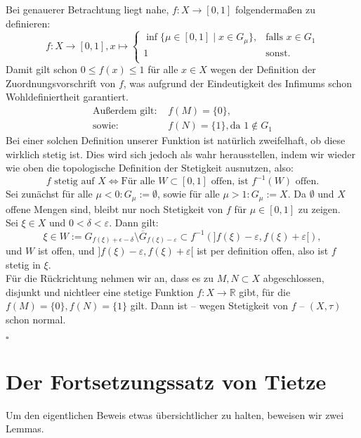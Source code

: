 \documentclass[11pt,leqno]{article}
\newcommand{\R}{\mathbb{R}}
\begin{document}
Bei genauerer Betrachtung liegt nahe, $f:X \rightarrow [0,1]$ folgendermaßen zu definieren:
\[f:X \rightarrow [0,1], x \mapsto \begin{cases}
    \inf \{\mu \in [0,1] \mid x \in G_\mu\},  & \text{falls }x \in G_1\\
    1 & \text{sonst.} \\
\end{cases} \]
Damit gilt schon $0 \leq f(x) \leq 1$ für alle $x \in X$ wegen der Definition der Zuordnungsvorschrift von $f$, was aufgrund der Eindeutigkeit des
Infimums schon Wohldefiniertheit garantiert.
\begin{align*}
    \text{Außerdem gilt: } & f(M) = \{0\}, \\
    \text{sowie: } &         f(N) = \{1\}, \text{da } 1 \notin G_1 
\end{align*}
Bei einer solchen Definition unserer Funktion ist natürlich zweifelhaft, ob diese wirklich stetig ist. Dies wird sich jedoch als wahr herausstellen,
indem wir wieder wie oben die topologische Definition der Stetigkeit ausnutzen, also:
\[f \text{ stetig auf } X \Leftrightarrow \text{Für alle } W \subset [0,1] \text { offen, ist } f^{-1}(W) \text{ offen.}\]
Sei zunächst für alle $\mu < 0: G_\mu := \emptyset$, sowie für alle $\mu > 1: G_\mu := X.$
Da $\emptyset$ und $X$ offene Mengen sind, bleibt nur noch Stetigkeit von $f$ für $\mu \in [0,1]$ zu zeigen. \\
Sei $\xi \in X$ und $0<\delta<\varepsilon$. Dann gilt: 
\[\xi \in W:=G_{f(\xi)+\epsilon-\delta}\setminus \overline{G}_{f(\xi)-\varepsilon} \subset f^{-1}(]f(\xi)-\varepsilon, f(\xi)+\varepsilon[),\]
und $W$ ist offen, und $]f(\xi)-\varepsilon, f(\xi)+\varepsilon[$ ist per definition offen, also ist $f$ stetig in $\xi$. \\
Für die Rückrichtung nehmen wir an, dass es zu $M,N \subset X$ abgeschlossen, disjunkt und nichtleer eine stetige Funktion 
$f:X \rightarrow \R$ gibt, für die $f(M)=\{0\}, f(N)=\{1\}$ gilt. Dann ist – wegen Stetigkeit von $f$ – $(X,\tau)$ schon normal.

\begin{flushright}
    $\square$
\end{flushright}

\section{Der Fortsetzungssatz von Tietze}
Um den eigentlichen Beweis etwas übersichtlicher zu halten, beweisen wir zwei Lemmas.
\end{document}
